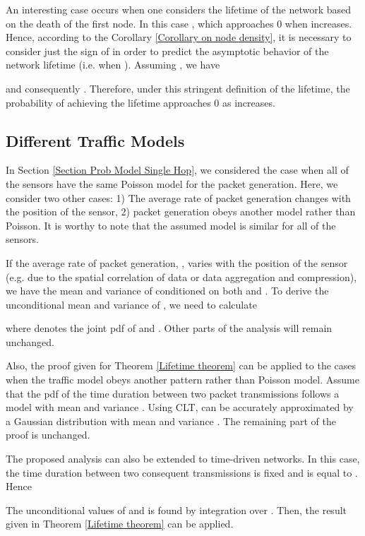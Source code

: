 \documentclass[conference]{IEEEtran}
\begin{document}
An interesting case occurs when one considers the lifetime of the
network based on the death of the first node. In this case , which approaches 0 when  increases. Hence,
according to the Corollary \ref{Corollary on node density}, it is
necessary to consider just the sign of  in order to predict
the asymptotic behavior of the network lifetime (i.e. when
). Assuming , we have

and consequently . Therefore, under this stringent
definition of the lifetime, the probability of achieving the
lifetime  approaches 0 as  increases.

\subsection{Different Traffic Models}
In Section \ref{Section Prob Model Single Hop}, we considered the
case when all of the sensors have the same Poisson model for the
packet generation. Here, we consider two other cases: 1) The average
rate of packet generation changes with the position of the sensor,
2) packet generation obeys another model rather than Poisson. It is
worthy to note that the assumed model is similar for all of the
sensors.

If the average rate of packet generation, , varies with the
position of the sensor (e.g. due to the spatial correlation of data
or data aggregation and compression), we have the mean and variance
of  conditioned on both  and . To derive the
unconditional mean and variance of , we need to calculate

where  denotes the joint pdf of  and
. Other parts of the analysis will remain unchanged.

Also, the proof given for Theorem \ref{Lifetime theorem} can be
applied to the cases when the traffic model obeys another pattern
rather than Poisson model. Assume that the pdf of the time duration
between two packet transmissions follows a model with mean 
and variance . Using CLT,  can be accurately
approximated by a Gaussian distribution with mean  and
variance . The remaining part of the proof is
unchanged.

The proposed analysis can also be extended to time-driven networks.
In this case, the time duration between two consequent transmissions
is fixed and is equal to . Hence

The unconditional values of  and  is found by
integration over . Then, the result given in Theorem
\ref{Lifetime theorem} can be applied.
\end{document}
